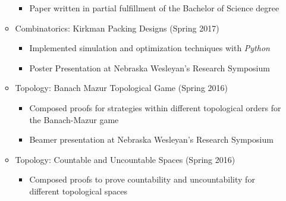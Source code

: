 \documentclass[10pt]{article}
\begin{document}
\begin{itemize}
\begin{itemize}
\begin{itemize}
\item Paper written in partial fulfillment of the Bachelor of Science degree
\end{itemize}
\item Combinatorics: Kirkman Packing Designs (Spring 2017)
\begin{itemize}
\item Implemented simulation and optimization techniques with \textit{Python}
\item Poster Presentation at Nebraska Wesleyan's Research Symposium
\end{itemize}
\item Topology: Banach Mazur Topological Game (Spring 2016)
\begin{itemize}
\item Composed proofs for strategies within different topological orders for the Banach-Mazur game
\item Beamer presentation at Nebraska Wesleyan's Research Symposium
\end{itemize}
\item Topology: Countable and Uncountable Spaces (Spring 2016)
\begin{itemize}
\item Composed proofs to prove countability and uncountability for different topological spaces
\end{itemize}
\end{itemize}
\end{itemize}
\text{}\\
\end{document}
